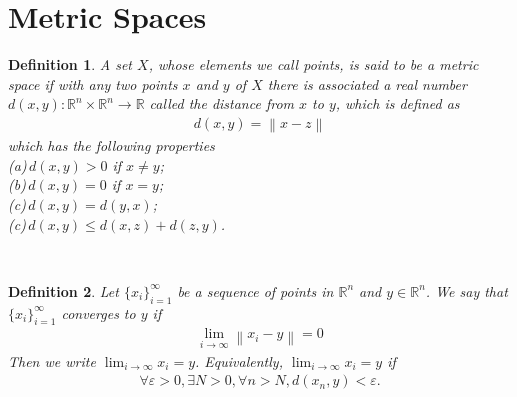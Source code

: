 \documentclass[12pt,leqno]{amsart}
\newtheorem{definition}{Definition}[section]
\theoremstyle{definition}
\begin{document}
\section{Metric Spaces}
\begin{definition}
A set $X$, whose elements we call points, is said to be a metric space if with any two points $x$ and $y$ of $X$ there is associated a real number $d(x,y): \mathbb{R}^n \times \mathbb{R}^n \rightarrow \mathbb{R}$ called the distance from $x$ to $y$, which is defined as 
\begin{align*}
    d(x,y) = \left\|x - z\right\|
\end{align*}
which has the following properties\\
\hspace*{1em}(a)\,$d(x,y) > 0$ if $x\neq y$;\\
\hspace*{1em}(b)\,$d(x,y) = 0$ if $x = y$;\\ 
\hspace*{1em}(c)\,$d(x,y) = d(y,x)$;\\ 
\hspace*{1em}(c)\,$d(x,y) \leq d(x,z) + d(z,y)$.
\end{definition}\\

\begin{definition}
Let $\{x_i\}^\infty_{i=1}$ be a sequence of points in $\mathbb{R}^n$ and $y\in\mathbb{R}^n$. We say that $\{x_i\}^\infty_{i=1}$ converges to $y$ if 
\begin{align*}
    \lim_{i\to\infty}\left\|x_i - y \right\| = 0
\end{align*}
Then we write $\lim_{i\to\infty}x_i = y$. Equivalently, $\lim_{i\to\infty}x_i = y$ if \begin{align*}
    \forall \varepsilon > 0, \exists N > 0, \forall n > N, d(x_n, y) < \varepsilon.
\end{align*}
\end{definition}

\medskip
\end{document}
